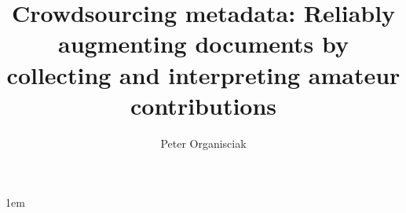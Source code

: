 \documentclass[tocnosub,edeposit,noragright,centerchapter,12pt]{uiucecethesis09}
\title{Crowdsourcing metadata: Reliably augmenting documents by collecting and interpreting amateur contributions}
\author{Peter Organisciak}
\begin{document}
%

%
\maketitle

\parindent 1em%

\frontmatter

%


%

%
%

%
\tableofcontents

%

%

%
\end{document}

